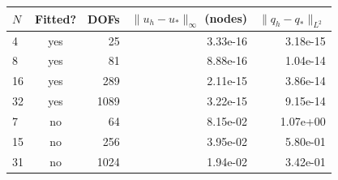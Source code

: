 \begin{tabular}{@{}lcrrr@{}}
\toprule
$N$ & Fitted? & DOFs & $\|u_h-u_*\|_\infty$ (nodes) & $\|q_h-q_*\|_{L^2}$\\
\midrule
4 & yes & 25 & 3.33e-16 & 3.18e-15\\
8 & yes & 81 & 8.88e-16 & 1.04e-14\\
16 & yes & 289 & 2.11e-15 & 3.86e-14\\
32 & yes & 1089 & 3.22e-15 & 9.15e-14\\
7 & no & 64 & 8.15e-02 & 1.07e+00\\
15 & no & 256 & 3.95e-02 & 5.80e-01\\
31 & no & 1024 & 1.94e-02 & 3.42e-01\\
\bottomrule
\end{tabular}
